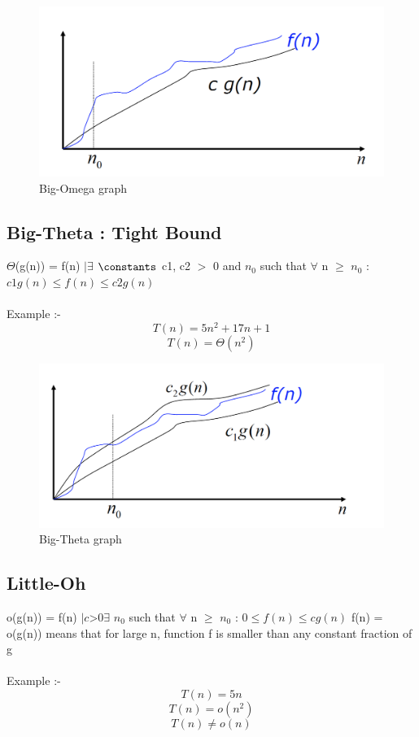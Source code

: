 \begin{figure}[H]
\centering
\includegraphics[scale=0.6]{figures/MDS6.png}
\caption{Big-Omega graph}
    \label{fig:example_figure}
\end{figure}

\subsection{Big-Theta : Tight Bound}
$\Theta$(g(n)) = { f(n) $| \exists$ $\constants$ c1, c2 $>$ 0 and $n_0$ such that $\forall$ n $\geq$ $n_0$ : $c1g(n) \leq f(n) \leq c2g(n)$ }
\\\\Example :-
\[ T(n) = 5n^2 + 17n + 1 \]
\[ T(n) = \Theta(n^2) \]

\begin{figure}[H]
\centering
\includegraphics[scale=0.6]{figures/MDS7.png}
\caption{Big-Theta graph}
    \label{fig:example_figure}
\end{figure}

\subsection{Little-Oh}
o(g(n)) = { f(n) $|  $\forall$ $\constant$ c $>$ 0 \exists$ $n_0$ such that $\forall$ n $\geq$ $n_0$ : $0 \leq f(n) \leq cg(n)$ }
f(n) = o(g(n)) means that for large n, function f is smaller
than any constant fraction of g
\\\\Example :-
\[ T(n) = 5n \]
\[ T(n) = o(n^2) \]
\[ T(n) \neq o(n) \]

